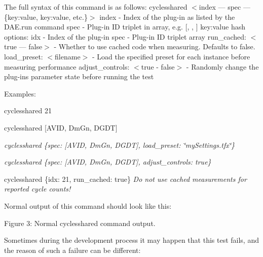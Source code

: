 The full syntax of this command is as follows\+:  {\ttfamily cyclesshared $<$index — spec — \{key\+:value, key\+:value, etc.\}$>$}   {\ttfamily index} -\/ Index of the plug-\/in as listed by the {\ttfamily D\+A\+E.\+run} command  {\ttfamily spec} -\/ Plug-\/in I\+D triplet in array, e.\+g. \mbox{[}\textquotesingle{}, \textquotesingle{}, \textquotesingle{}\mbox{]}  {\ttfamily key\+:value} hash options\+:   {\ttfamily idx} -\/ Index of the plug-\/in  {\ttfamily spec} -\/ Plug-\/in I\+D triplet array  {\ttfamily run\+\_\+cached\+: $<$true — false$>$} -\/ Whether to use cached code when measuring. Defaults to false.  {\ttfamily load\+\_\+preset\+: $<$filename$>$} -\/ Load the specified preset for each instance before measuring performance  {\ttfamily adjust\+\_\+controls\+: $<$true -\/ false$>$} -\/ Randomly change the plug-\/in\textquotesingle{}s parameter state before running the test

Examples\+: 
\begin{DoxyItemize}
\item {\ttfamily cyclesshared 21 } 
\item {\ttfamily cyclesshared \mbox{[}\textquotesingle{}A\+V\+I\+D\textquotesingle{}, \textquotesingle{}Dm\+Gn\textquotesingle{}, \textquotesingle{}D\+G\+D\+T\textquotesingle{}\mbox{]}}  
\item {\itshape {\ttfamily cyclesshared \{spec\+: \mbox{[}\textquotesingle{}A\+V\+I\+D\textquotesingle{}, \textquotesingle{}Dm\+Gn\textquotesingle{}, \textquotesingle{}D\+G\+D\+T\textquotesingle{}\mbox{]}, load\+\_\+preset\+: \char`\"{}my\+Settings.\+tfx\char`\"{}\} }} 
\item {\itshape {\ttfamily cyclesshared \{spec\+: \mbox{[}\textquotesingle{}A\+V\+I\+D\textquotesingle{}, \textquotesingle{}Dm\+Gn\textquotesingle{}, \textquotesingle{}D\+G\+D\+T\textquotesingle{}\mbox{]}, adjust\+\_\+controls\+: true\} }} 
\item {\ttfamily cyclesshared \{idx\+: 21, run\+\_\+cached\+: true\} } {\itshape Do not use cached measurements for reported cycle counts!} 
\end{DoxyItemize}

Normal output of this command should look like this\+:

 Figure 3\+: Normal cyclesshared command output.

Sometimes during the development process it may happen that this test fails, and the reason of such a failure can be different\+:


